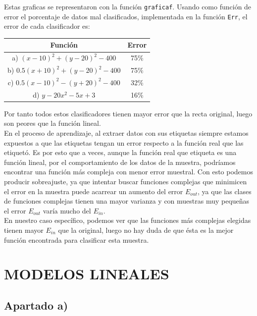 \documentclass{article}
\begin{document}
Estas graficas se representaron con la función \texttt{graficaf}.
Usando como función de error el porcentaje de datos mal clasificados, implementada en la función \texttt{Err}, el error de cada clasificador es:

\begin{center}
\begin{tabular}{|c|c|}
\hline
\multicolumn{1}{|c|}{\textbf{Función}}& 
\textbf{Error}  \\ \hline
  a) $(x-10)^2+(y-20)^2-400$    & 75\% \\
  b) $0.5(x+10)^2+(y-20)^2-400$ & 75\% \\
  c) $0.5(x-10)^2-(y+20)^2-400$ & 32\% \\
  d) $y-20x^2-5x+3$             & 16\% \\ \hline
\end{tabular}
\end{center}

Por tanto todos estos clasificadores tienen mayor error que la recta original, luego son peores que la función lineal.\\

En el proceso de aprendizaje, al extraer datos con sus etiquetas siempre estamos expuestos a que las etiquetas tengan un error respecto a la función real que las etiquetó. Es por esto que a veces, aunque la función real que etiqueta es una función lineal, por el comportamiento de los datos de la muestra, podríamos encontrar una función más compleja con menor error muestral. Con esto podemos producir sobreajuste, ya que intentar buscar funciones complejas que minimicen el error en la muestra puede acarrear un aumento del error $E_{out}$, ya que las clases de funciones complejas tienen una mayor varianza y con muestras muy pequeñas el error $E_{out}$ varía mucho del $E_{in}$.\\
En nuestro caso específico, podemos ver que las funciones más complejas elegidas tienen mayor $E_{in}$ que la  original, luego no hay duda de que ésta es la mejor función encontrada para clasificar esta muestra.

\section{MODELOS LINEALES}

\subsection{Apartado a)}
\end{document}
